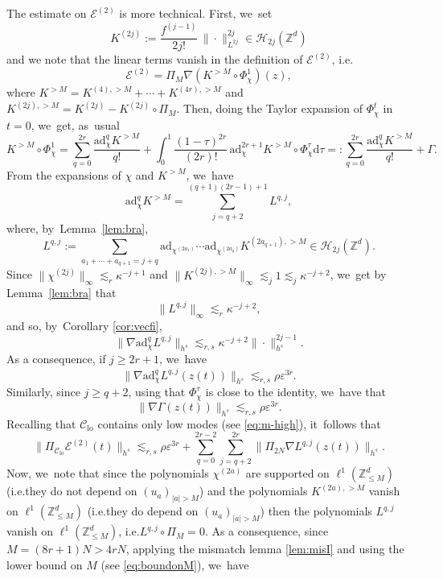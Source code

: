 \documentclass[10pt,a4paper]{amsart}
\providecommand{\ie}{i.e.}
\theoremstyle{plain}
\theoremstyle{definition}
\DeclareMathOperator{\lo}{lo}
\newcommand{\1}{\mathbf{1}}
\newcommand{\Clo}{\mathscr{C}_{\lo}}
\begin{document}
The estimate on $\mathcal{E}^{(2)}$ is more technical. First, we~set\vspace*{-3pt}
\[
K^{(2j)} := \frac{f^{(j-1)}}{2j!}\, \| \cdot \|_{L^{2j}}^{2j} \in \mathcal{H}_{2j}(\mathbb{Z}^d)
\]
and we note that the linear terms vanish in the definition of $\mathcal{E}^{(2)}$, \ie\vspace*{-3pt}
\[
\mathcal{E}^{(2)} = \Pi_M \nabla (K^{>M} \circ \Phi_\chi^1) (z),
\]
where $K^{>M} = K^{(4),>M}+ \cdots + K^{(4r),>M}$ and $K^{(2j),>M} = K^{(2j)} - K^{(2j)}\circ \Pi_M$. Then, doing the Taylor expansion of $\Phi_\chi^t$ in $t=0$, we~get, as~usual\vspace*{-3pt}
\[
K^{>M} \circ \Phi_\chi^1 = \sum_{q=0}^{2r} \frac{\mathrm{ad}_{\chi}^q K^{>M}}{q!} + \int_0^1 \frac{(1-\tau)^{2r}}{(2r)!}\, \mathrm{ad}_{\chi}^{2r+1} K^{>M}\circ \Phi_\chi^\tau \mathrm{d}\tau =: \sum_{q=0}^{2r} \frac{\mathrm{ad}_{\chi}^q K^{>M}}{q!} + \Gamma.
\]
From the expansions of $\chi$ and $K^{>M}$, we~have\vspace*{-3pt}
\[
\mathrm{ad}_{\chi}^q K^{>M} = \sum_{j=q+2}^{(q+1)(2r-1)+1} L^{q,j},
\]
where, by~Lemma~\ref{lem:bra},\vspace*{-3pt}
\[
L^{q,j} := \sum_{ a_1 + \cdots + a_{q+1} = j+q } \mathrm{ad}_{\chi^{(2a_1)}} \cdots \mathrm{ad}_{\chi^{(2a_q)}} K^{(2a_{q+1}),>M} \in \mathcal{H}_{2j}(\mathbb{Z}^d).
\]
Since $\| \chi^{(2j)} \|_{\infty} \lesssim_r \kappa^{-j+1}$ and $\| K^{(2j),>M} \|_{\infty} \lesssim_j 1 \lesssim_j \kappa^{-j+2}$, we~get by Lemma~\ref{lem:bra} that
\[
\| L^{q,j} \|_{\infty} \lesssim_{r} \kappa^{-j+2},
\]
and so, by~Corollary \ref{cor:vecfi},
\[
\| \nabla \mathrm{ad}_{\chi}^q L^{q,j} \|_{h^s} \lesssim_{r,s} \kappa^{-j+2} \| \cdot\|_{h^s}^{2j-1}.
\]
As a consequence, if $j\geq 2r+1$, we~have
\[
\| \nabla \mathrm{ad}_{\chi}^q L^{q,j} (z(t)) \|_{h^s} \lesssim_{r,s} \rho \varepsilon^{3r}.
\]
Similarly, since $j\geq q+2$, using that $\Phi_\chi^\tau $ is close to the identity, we~have that
\[
\| \nabla \Gamma(z(t)) \|_{h^s} \lesssim_{r,s} \rho \varepsilon^{3r}.
\]
Recalling that $\Clo$ contains only low modes (see \eqref{eq:m-high}), it~follows that
\[
\| \Pi_{\Clo} \mathcal{E}^{(2)}(t)\|_{h^s} \lesssim_{r,s} \rho \varepsilon^{3r} + \sum_{q=0}^{2r-2} \sum_{j=q+2}^{2r} \| \Pi_{2N} \nabla L^{q,j}(z(t)) \|_{h^s}.
\]
Now, we~note that since the polynomials $\chi^{(2a)}$ are supported on $\ell^1(\mathbb{Z}^d_{\leq M})$ (\ie they do not depend on $(u_a)_{|a|>M}$) and the polynomials $K^{(2a),>M}$ vanish on $\ell^1(\mathbb{Z}^d_{\leq M})$ (\ie they do depend on $(u_a)_{|a|>M}$) then the polynomials $L^{q,j}$ vanish on $\ell^1(\mathbb{Z}^d_{\leq M})$, \ie $L^{q,j}\circ \Pi_M =0$. As a consequence, since $M=(8r+1)N>4rN$, applying the mismatch lemma \ref{lem:misI} and using the lower bound on $M$ (see \eqref{eq:boundonM}), we~have
\end{document}
